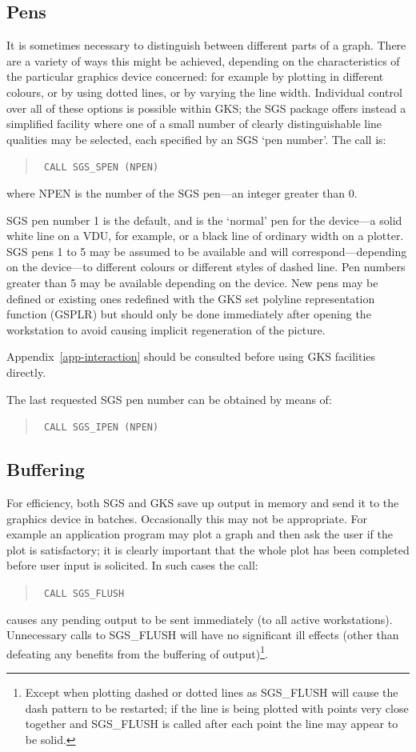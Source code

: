 \documentclass[11pt]{article}
\newcommand{\hyperref}[4]{#2\ref{#4}#3}
\newcommand{\htmlref}[2]{#1}
\begin{document}
\subsection {Pens}

It is sometimes necessary to distinguish between different parts
of a graph.  There are a variety
of ways this might be achieved, depending
on the characteristics of the particular graphics device
concerned: for example
by plotting in different
colours, or by using dotted lines, or by varying the
line width.  Individual control over all of
these options is possible within GKS;  the
SGS package offers instead a simplified facility
where one of a small
number of clearly distinguishable line qualities may
be selected, each specified by an SGS `pen number'.  The call is:
\begin{quote}{\tt
    CALL \htmlref{SGS\_SPEN}{SGS_SPEN} (NPEN)}
\end{quote}
where NPEN is the number of the SGS pen---an integer greater than 0.

SGS pen number 1 is the default, and is the `normal' pen for the
device---a solid white line on a VDU, for example, or a black
line of ordinary width on a plotter.  SGS pens 1 to 5
may be assumed to be available and will correspond---depending
on the device---to different colours or
different styles of dashed line. 
Pen numbers greater than 5 may be available depending
on the device.  New pens may be defined or existing ones redefined with
the GKS set polyline representation function (GSPLR) but should only
be done immediately after opening the workstation to avoid causing implicit
regeneration of the picture.

\hyperref{This appendix}{Appendix~}{}{app-interaction} should be 
consulted before using GKS facilities directly. 

The last requested SGS pen number can be obtained by means of:
\begin{quote}{\tt
    CALL \htmlref{SGS\_IPEN}{SGS_IPEN} (NPEN)}
\end{quote}

\subsection {Buffering}

For efficiency, both SGS and GKS save up output
in memory and send it to the graphics device
in batches.  Occasionally
this may not be appropriate.  For example an application program
may plot a graph and then ask the user if the plot is
satisfactory;  it
is clearly important that the whole plot has been completed
before user input is
solicited.  In such cases the call:
\begin{quote}{\tt
    CALL \htmlref{SGS\_FLUSH}{SGS_FLUSH}}
\end{quote}
causes any pending output to be sent immediately (to all active
workstations).  Unnecessary calls to SGS\_FLUSH will have no significant
ill effects (other than defeating any benefits from the buffering of 
output)\footnote{Except when plotting dashed or dotted lines as SGS\_FLUSH will
cause the dash pattern to be restarted; if the line is being plotted with
points very close together and SGS\_FLUSH is called after each point the
line may appear to be solid.}.
\end{document}
